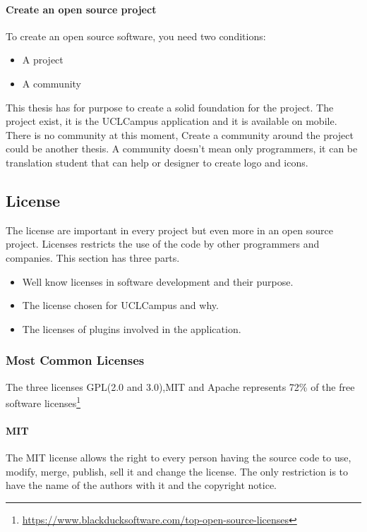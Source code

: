 \documentclass[11pt, a4paper]{report}
\begin{document}
\paragraph{Create an open source project\\}
To create an open source software, you need two conditions:
\begin{itemize}
\item A project
\item A community
\end{itemize}

This thesis has for purpose to create a solid foundation for the project. The project exist, it is the UCLCampus application and it is available on mobile. There is no community at this moment, Create a community around the project could be another thesis. A community doesn't mean only programmers, it can be translation student that can help or designer to create logo and icons. 

\subsection{License}
The license are important in every project but even more in an open source project. Licenses restricts the use of the code by other programmers and companies. This section has three parts.
\begin{itemize}
\item Well know licenses in software development and their purpose.
\item The license chosen for UCLCampus and why.
\item The licenses of plugins involved in the application.
\end{itemize}
\subsubsection{Most Common Licenses}
The three licenses GPL(2.0 and 3.0),MIT and Apache represents 72\% of the free software licenses\footnote{\url{https://www.blackducksoftware.com/top-open-source-licenses}}
\paragraph{MIT}
The MIT license allows the right to every person having the source code to use, modify, merge, publish, sell it and change the license. The only restriction is to have the name of the authors with it and the copyright notice.
\end{document}
